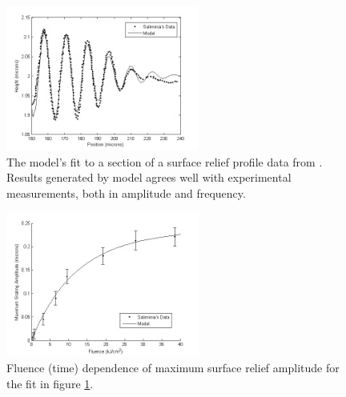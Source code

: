 \documentclass[aps, prl, twocolumn, groupedaddress]{revtex4-1}
\begin{document}
\begin{figure}[!htbp]
  \includegraphics[width=2.5in]{figure/sinefigurezoom.png}
  \caption{The model's fit to a section of a surface relief profile
    data from \cite{saliminia}. Results generated by model agrees well
    with experimental measurements, both in amplitude and frequency.}
  \label{fig:sinemodzoom}
\end{figure}

\begin{figure}[!htbp]
  \includegraphics[width=2.5in]{figure/saliminiagrowth.png}
  \caption{Fluence (time) dependence of maximum surface relief
    amplitude for the fit in figure \ref{fig:sinemodzoom}.}
  \label{fig:salgrowth}
\end{figure}

\end{document}
